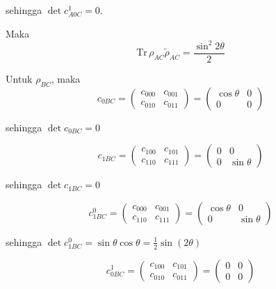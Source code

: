 \begin{enumerate}
	sehingga $\det c_{A0C}^1 = 0$.
	
	Maka
	\begin{equation}
		\mathrm{Tr}\,\rho_{AC}\tilde{\rho}_{AC}=\frac{\sin^2 2\theta}{2}
	\end{equation}
	
	Untuk $\rho_{BC}$, maka
	\begin{equation}
		c_{0BC}=
		\begin{pmatrix}
			c_{000} & c_{001} \\
			c_{010} & c_{011}
		\end{pmatrix}=
		\begin{pmatrix}
			\cos\theta & 0 \\
			0 & 0
		\end{pmatrix}
	\end{equation}
	
	sehingga $\det c_{0BC} = 0$
	
	\begin{equation}
		c_{1BC}=
		\begin{pmatrix}
			c_{100} & c_{101} \\
			c_{110} & c_{111}
		\end{pmatrix}=
		\begin{pmatrix}
			0 & 0 \\
			0 & \sin\theta
		\end{pmatrix}
	\end{equation}
	
	sehingga $\det c_{1BC} = 0$
	
	\begin{equation}
		c_{1BC}^0=
		\begin{pmatrix}
			c_{000} & c_{001} \\
			c_{110} & c_{111}
		\end{pmatrix}=
		\begin{pmatrix}
			\cos\theta & 0 \\
			0 & \sin\theta
		\end{pmatrix}
	\end{equation}
	
	sehingga $\det c_{1BC}^0 = \sin\theta \cos\theta = \frac{1}{2}\sin(2\theta)$
	
	\begin{equation}
		c_{0BC}^1=
		\begin{pmatrix}
			c_{100} & c_{101} \\
			c_{010} & c_{011}
		\end{pmatrix}=
		\begin{pmatrix}
			0 & 0 \\
			0 & 0
		\end{pmatrix}
	\end{equation}
	

\end{enumerate}
